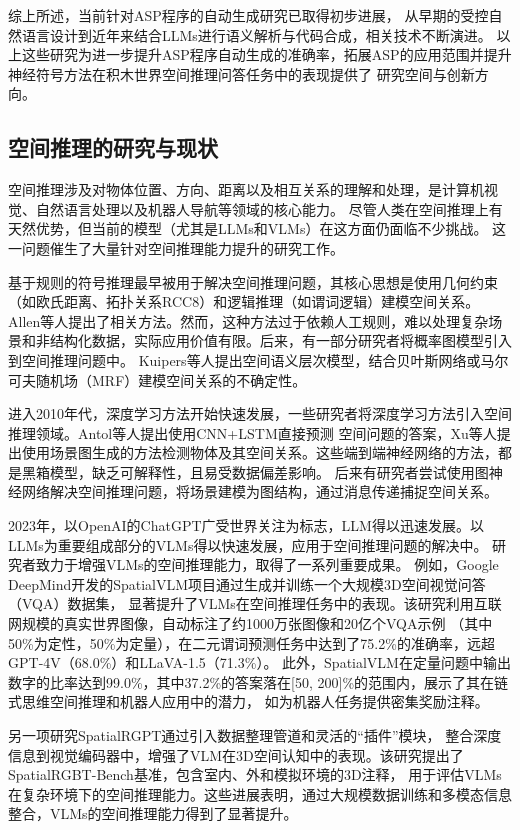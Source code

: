 综上所述，当前针对ASP程序的自动生成研究已取得初步进展，
从早期的受控自然语言设计到近年来结合LLMs进行语义解析与代码合成，相关技术不断演进。
以上这些研究为进一步提升ASP程序自动生成的准确率，拓展ASP的应用范围并提升神经符号方法在积木世界空间推理问答任务中的表现提供了
研究空间与创新方向。
\subsection{空间推理的研究与现状}
空间推理涉及对物体位置、方向、距离以及相互关系的理解和处理，是计算机视觉、自然语言处理以及机器人导航等领域的核心能力。
尽管人类在空间推理上有天然优势，但当前的模型（尤其是LLMs和VLMs）在这方面仍面临不少挑战。
这一问题催生了大量针对空间推理能力提升的研究工作。

基于规则的符号推理最早被用于解决空间推理问题，其核心思想是使用几何约束（如欧氏距离、拓扑关系RCC8）和逻辑推理（如谓词逻辑）建模空间关系。
Allen等人提出了相关方法。然而，这种方法过于依赖人工规则，难以处理复杂场景和非结构化数据，实际应用价值有限。后来，有一部分研究者将概率图模型引入到空间推理问题中。
Kuipers等人提出空间语义层次模型，结合贝叶斯网络或马尔可夫随机场（MRF）建模空间关系的不确定性。

进入2010年代，深度学习方法开始快速发展，一些研究者将深度学习方法引入空间推理领域。Antol等人\cite{Antol2015VQA}提出使用CNN+LSTM直接预测
空间问题的答案，Xu等人\cite{xu2017scene}提出使用场景图生成的方法检测物体及其空间关系。这些端到端神经网络的方法，都是黑箱模型，缺乏可解释性，且易受数据偏差影响。
后来有研究者尝试使用图神经网络解决空间推理问题，将场景建模为图结构，通过消息传递捕捉空间关系。

2023年，以OpenAI的ChatGPT广受世界关注为标志，LLM得以迅速发展。以LLMs为重要组成部分的VLMs得以快速发展，应用于空间推理问题的解决中。
研究者致力于增强VLMs的空间推理能力，取得了一系列重要成果。
例如，Google DeepMind开发的SpatialVLM\cite{chen2024spatialvlmendowingvisionlanguagemodels}项目通过生成并训练一个大规模3D空间视觉问答（VQA）数据集，
显著提升了VLMs在空间推理任务中的表现。该研究利用互联网规模的真实世界图像，自动标注了约1000万张图像和20亿个VQA示例
（其中50\%为定性，50\%为定量），在二元谓词预测任务中达到了75.2\%的准确率，远超GPT-4V（68.0\%）和LLaVA-1.5（71.3\%）。
此外，SpatialVLM在定量问题中输出数字的比率达到99.0\%，其中37.2\%的答案落在[50, 200]\%的范围内，展示了其在链式思维空间推理和机器人应用中的潜力，
如为机器人任务提供密集奖励注释。

另一项研究SpatialRGPT\cite{cheng2024spatialrgptgroundedspatialreasoning}通过引入数据整理管道和灵活的“插件”模块，
整合深度信息到视觉编码器中，增强了VLM在3D空间认知中的表现。该研究提出了SpatialRGBT-Bench基准，包含室内、外和模拟环境的3D注释，
用于评估VLMs在复杂环境下的空间推理能力。这些进展表明，通过大规模数据训练和多模态信息整合，VLMs的空间推理能力得到了显著提升。


